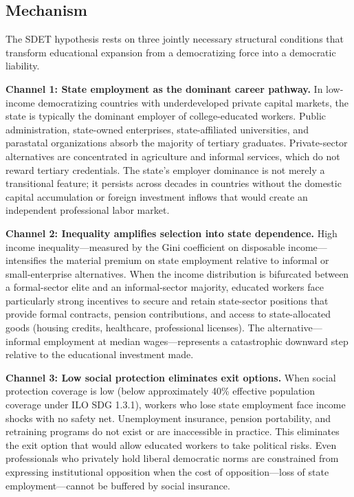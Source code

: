 \documentclass[11pt,letterpaper]{article}
\begin{document}
\subsection{Mechanism}

The SDET hypothesis rests on three jointly necessary structural conditions that transform
educational expansion from a democratizing force into a democratic liability.

\textbf{Channel 1: State employment as the dominant career pathway.} In low-income democratizing
countries with underdeveloped private capital markets, the state is typically the dominant employer
of college-educated workers. Public administration, state-owned enterprises, state-affiliated
universities, and parastatal organizations absorb the majority of tertiary graduates.
Private-sector alternatives are concentrated in agriculture and informal services, which do not
reward tertiary credentials. The state's employer dominance is not merely a transitional feature;
it persists across decades in countries without the domestic capital accumulation or foreign
investment inflows that would create an independent professional labor market.

\textbf{Channel 2: Inequality amplifies selection into state dependence.} High income
inequality---measured by the Gini coefficient on disposable income---intensifies the material
premium on state employment relative to informal or small-enterprise alternatives. When the income
distribution is bifurcated between a formal-sector elite and an informal-sector majority, educated
workers face particularly strong incentives to secure and retain state-sector positions that provide
formal contracts, pension contributions, and access to state-allocated goods (housing credits,
healthcare, professional licenses). The alternative---informal employment at median wages---represents
a catastrophic downward step relative to the educational investment made.

\textbf{Channel 3: Low social protection eliminates exit options.} When social protection coverage
is low (below approximately 40\% effective population coverage under ILO SDG 1.3.1), workers who
lose state employment face income shocks with no safety net. Unemployment insurance, pension
portability, and retraining programs do not exist or are inaccessible in practice. This eliminates
the exit option that would allow educated workers to take political risks. Even professionals who
privately hold liberal democratic norms are constrained from expressing institutional opposition
when the cost of opposition---loss of state employment---cannot be buffered by social insurance.
\end{document}

